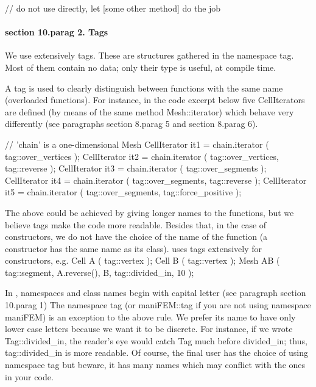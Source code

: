 \verbatim
   // do not use directly, let [some other method] do the job
\endverbatim


\paragraph{\numb section 10.\numb parag 2. Tags}

We use extensively {\codett tag}s.
These are structures gathered in the {\codett namespace tag}.
Most of them contain no data; only their type is useful, at compile time.

A {\codett tag} is used to clearly distinguish between functions with the same name
(overloaded functions).
For instance, in the code excerpt below five {\codett CellIterator}s are defined
(by means of the same method {\codett Mesh::iterator}) which
behave very differently (see paragraphs \numb section 8.\numb parag 5 and
\numb section 8.\numb parag 6).

\verbatim
   // 'chain' is a one-dimensional Mesh
   CellIterator it1 = chain.iterator ( tag::over_vertices );
   CellIterator it2 = chain.iterator ( tag::over_vertices, tag::reverse );
   CellIterator it3 = chain.iterator ( tag::over_segments );
   CellIterator it4 = chain.iterator ( tag::over_segments, tag::reverse );
   CellIterator it5 = chain.iterator ( tag::over_segments, tag::force_positive );
\endverbatim

The above could be achieved by giving longer names to the functions, but we believe
{\codett tag}s make the code more readable.
Besides that, in the case of constructors, we do not have the choice of the name of the function
(a constructor has the same name as its class).
{\ManiFEM} uses {\codett tag}s extensively for constructors, e.g.
\verbatim
   Cell A ( tag::vertex );  Cell B ( tag::vertex );
   Mesh AB ( tag::segment, A.reverse(), B, tag::divided_in, 10 );
\endverbatim

In \maniFEM, namespaces and class names begin with capital letter
(see paragraph \numb section 10.\numb parag 1)
The namespace {\codett tag} (or {\codett maniFEM::tag} if you are not
{\codett using namespace maniFEM}) is an exception to the above rule.
We prefer its name to have only lower case letters because we want it to be
discrete. For instance, if we wrote {\codett Tag::divided\_in},
the reader's eye would catch {\codett Tag} much before {\codett divided\_in};
thus, {\codett tag::divided\_in} is more readable.
Of course, the final user has the choice of {\codett using namespace tag}
but beware, it has many names which may conflict with the ones in your code.

